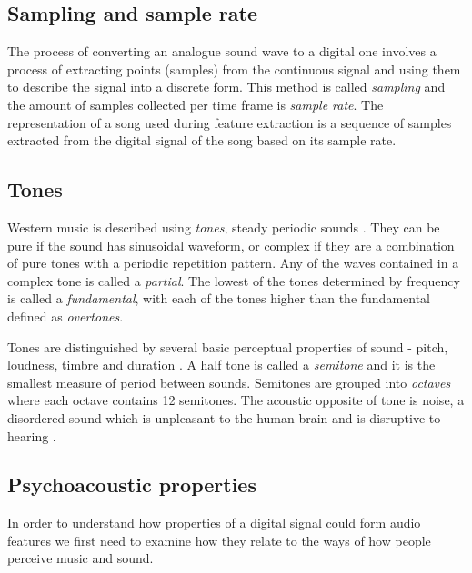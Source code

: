\subsection{Sampling and sample rate}
\label{subsec:sampling}
The process of converting an analogue sound wave to a digital one involves a
process of extracting points (samples) from the continuous signal and using them
to describe the signal into a discrete form. This method is called
\textit{sampling} and the amount of samples collected per time frame is
\textit{sample rate}. The representation of a song used during feature
extraction is a sequence of samples extracted from the digital signal of the
song based on its sample rate.

\subsection{Tones}
\label{subsec:tones}
Western music is described using \textit{tones}, steady periodic sounds
\cite{wiki:tone}. They can be pure if the sound has sinusoidal waveform, or
complex if they are a combination of pure tones with a periodic repetition
pattern. Any of the waves contained in a complex tone is called a
\textit{partial}. The lowest of the tones determined by frequency is called a
\textit{fundamental}, with each of the tones higher than the fundamental defined
as \textit{overtones}. 

Tones are distinguished by several basic perceptual properties of sound - pitch,
loudness, timbre and duration \cite{acoustic-glossary-power}. A half tone is
called a \textit{semitone} and it is the smallest measure of period between
sounds. Semitones are grouped into \textit{octaves} where each octave contains
12 semitones. The acoustic opposite of tone is noise, a disordered sound which
is unpleasant to the human brain and is disruptive to hearing
\cite{music-noise}. 

\subsection{Psychoacoustic properties}
\label{subsec:psychoacoustic}
In order to understand how properties of a digital signal could form audio
features we first need to examine how they relate to the ways of how people
perceive music and sound. 

